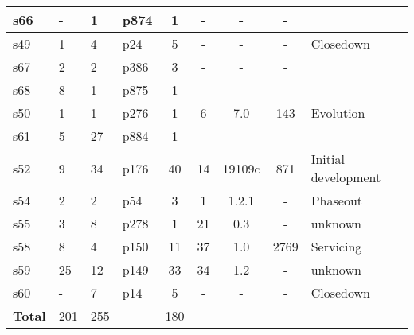 \begin{longtable}{| l | l | l | l | c | c | c | c | l |}
    \hline
s66 & - & 1 & p874 & 1 & - & - & - &  \\
    \hline
s49 & 1 & 4 & p24 & 5 & - & - & - & Closedown \\
    \hline
s67 & 2 & 2 & p386 & 3 & - & - & - &  \\
    \hline
s68 & 8 & 1 & p875 & 1 & - & - & - &  \\
    \hline
s50 & 1 & 1 & p276 & 1 & 6 & 7.0 & 143 & Evolution \\
    \hline
s61 & 5 & 27 & p884 & 1 & - & - & - &  \\
    \hline
s52 & 9 & 34 & p176 & 40 & 14 & 19109c & 871 & Initial development \\
    \hline
s54 & 2 & 2 & p54 & 3 & 1 & 1.2.1 & - & Phaseout \\
    \hline
s55 & 3 & 8 & p278 & 1 & 21 & 0.3 & - & unknown \\
    \hline
s58 & 8 & 4 & p150 & 11 & 37 & 1.0 & 2769 & Servicing \\
    \hline
s59 & 25 & 12 & p149 & 33 & 34 & 1.2 & - & unknown \\
    \hline
s60 & - & 7 & p14 & 5 & - & - & - & Closedown \\
    \hline
  \hline
{\bf Total} & 201 & 255 &  & 180 &  &  &  &  \\
  \hline
\end{longtable}
